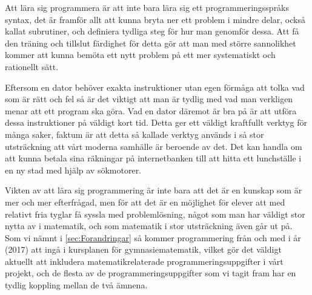 \textcolor{Mahogany}{Att lära sig programmera är att inte bara lära sig ett programmeringsspråks syntax, det är framför allt att kunna bryta ner ett problem i mindre delar, också kallat subrutiner, och definiera tydliga steg för hur man genomför dessa. Att få den träning och tillslut färdighet för detta gör att man med större sannolikhet kommer att kunna bemöta ett nytt problem på ett mer systematiskt och rationellt sätt.}

\textcolor{Mahogany}{Eftersom en dator behöver exakta instruktioner utan egen förmåga att tolka vad som är rätt och fel så är det viktigt att man är tydlig med vad man verkligen menar att ett program ska göra. Vad en dator däremot är bra på är att utföra dessa instruktioner på väldigt kort tid. Detta ger ett väldigt kraftfullt verktyg för många saker, faktum är att detta så kallade verktyg används i så stor utsträckning att vårt moderna samhälle är beroende av det. Det kan handla om att kunna betala sina räkningar på internetbanken till att hitta ett lunchställe i en ny stad med hjälp av sökmotorer.}

\textcolor{Mahogany}{Vikten av att lära sig programmering är inte bara att det är en kunskap som är mer och mer efterfrågad, men för att det är en möjlighet för elever att med relativt fria tyglar få syssla med problemlösning, något som man har väldigt stor nytta av i matematik\cite{TheElephant}, och som matematik i stor utsträckning även går ut på. Som vi nämnt i \ref{sec:Forandringar} så kommer programmering från och med i år (2017) att ingå i kursplanen för gymnasiematematik, vilket gör det väldigt aktuellt att inkludera matematikrelaterade programmeringsuppgifter i vårt projekt, och de flesta av de programmeringsuppgifter som vi tagit fram har en tydlig koppling mellan de två ämnena.}